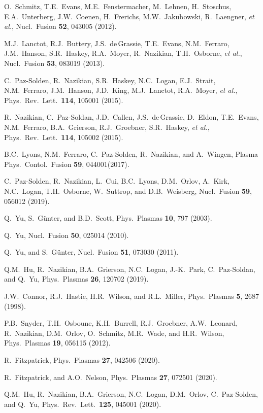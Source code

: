 \documentclass[12pt,prb,aps]{revtex4-1}
\begin{document}
\begin{thebibliography}{99}
 O.~Schmitz, T.E.~Evans, M.E.~Fenstermacher, M.~Lehnen, H.~Stoschus, E.A.~Unterberg, J.W.~Coenen, H.~Frerichs, M.W.~Jakubowski, R.~Laengner, {\em et al.}, 
Nucl.\ Fusion {\bf 52}, 043005 (2012). 

 M.J.~Lanctot, R.J.~Buttery, J.S.~de\,Grassie, T.E.~Evans, N.M.~Ferraro, J.M.~Hanson, S.R.~Haskey,  R.A.~Moyer, R.~Nazikian, T.H.~Osborne, {\em et al.}, 
Nucl.\ Fusion {\bf 53}, 083019 (2013). 

 C.~Paz-Solden, R.~Nazikian, S.R.~Haskey, N.C.~Logan, E.J.~Strait, N.M.~Ferraro, J.M.~Hanson, J.D.~King, M.J.~Lanctot, R.A.~Moyer, {\it et al.}, 
Phys.\ Rev.\ Lett.\ {\bf 114}, 105001 (2015).

 R.~Nazikian, C.~Paz-Soldan, J.D.~Callen,  J.S.~de\,Grassie, D.~Eldon, T.E.~Evans, N.M.~Ferraro,  B.A.~Grierson, R.J.~Groebner, S.R.~Haskey, {\em et al.}, 
Phys.\ Rev.\ Lett.\ {\bf 114}, 105002 (2015).

 B.C.~Lyons, N.M.~Ferraro, C.~Paz-Solden, R.~Nazikian, and A.~Wingen, Plasma Phys.\ Contol.\ Fusion {\bf 59}, 044001(2017).

 C.~Paz-Solden, R.~Nazikian, L.~Cui, B.C.~Lyons,  D.M.~Orlov, A.~Kirk, N.C.~Logan, T.H.~Osborne, W.~Suttrop, and D.B.~Weisberg, 
Nucl.\ Fusion {\bf 59}, 056012 (2019). 

 Q.~Yu, S.~G\"{u}nter,  and B.D.~Scott, Phys.\ Plasmas {\bf 10}, 797 (2003).

 Q.~Yu, Nucl.\ Fusion {\bf 50}, 025014 (2010).

 Q.~Yu, and S.~G\"unter,  Nucl.\ Fusion {\bf 51},  073030 (2011).

 Q.M.~Hu,  R.~Nazikian,  B.A.~Grierson,  N.C.~Logan,  J.-K.~Park,  C.~Paz-Soldan, and Q.~Yu,  Phys.\ Plasmas {\bf 26}, 120702 (2019).
 
 J.W.~Connor,  R.J.~Hastie, H.R.~Wilson, and R.L.~Miller, Phys.\ Plasmas  {\bf 5}, 2687 (1998).

  P.B.~Snyder, T.H.~Osboune, K.H.~Burrell, R.J.~Groebner, A.W.~Leonard, R.~Nazikian, D.M.~Orlov, O.~Schmitz, M.R.~Wade, and H.R.~Wilson, 
 Phys.\ Plasmas {\bf 19}, 056115 (2012).

 R.~Fitzpatrick, Phys.\ Plasmas {\bf 27}, 042506 (2020).

 R.~Fitzpatrick, and A.O.~Nelson, Phys.\ Plasmas {\bf 27}, 072501 (2020).

 Q.M.~Hu, R.~Nazikian, B.A.~Grierson, N.C.~Logan, D.M.~Orlov, C.~Paz-Solden, and Q.~Yu, 
Phys.\ Rev.\ Lett.\ {\bf 125}, 045001 (2020).


\end{thebibliography}
\end{document}
